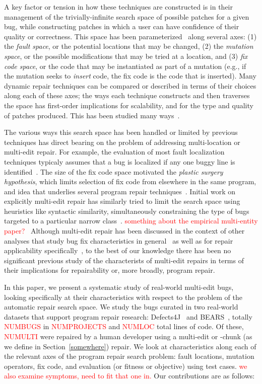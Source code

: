 \documentclass[sigconf, timestamp-false, anonymous=true]{acmart}
\newcommand\todo[1]{\textcolor{red}{#1}}
\begin{document}
A key factor or tension in how these techniques are constructed is in their
management of the trivially-infinite search space of possible patches for a
given bug, while constructing patches in which a user can have confidence of
their quality or correctness.  This space has been parameterized~\cite{refs}
along several axes: (1) the \emph{fault space}, or the potential locations that
may be changed, (2) the \emph{mutation space}, or the possible modifications
that may be tried at a location, and (3) \emph{fix code space}, or the code that may
be instantiated as part of a mutation (e.g., if the mutation seeks to
\emph{insert} code, the fix code is the code that is inserted).  Many dynamic
repair techniques can be compared or described in terms of their choices along
each of these axes; the ways each technique constructs and then traverses the
space has first-order implications for scalability, and for the type and quality
of patches produced.  This has been studied many ways~\cite{examples}.

The various ways this search space has been handled or limited by previous
techniques has direct bearing on the problem of addressing multi-location or
multi-edit repair. For example, the evaluation of most fault localization
techniques typicaly assumes that a bug is localized if any one buggy line is
identified~\cite{fl-survey-wong}.  The size of the fix code space motivated the
\emph{plastic surgery hypothesis}, which limits selection of fix code from
elsewhere in the same program, and idea that underlies several program repair
techniques~\cite{foo}.  
Initial work on explicitly multi-edit repair has similarly tried to limit the
search space using heuristics like syntactic similarity, simultaneously constraining the type
of bugs targeted to a particular narrow
class~\cite{saha2019harnessing,jiang2019cmsuggester}. \todo{something about the
  empirical multi-entity paper?~\cite{wang2018}} 
Although multi-edit repair has been discussed in the context of other analyses
that study bug fix characteristics in general~\cite{examples} as well as for
repair applicability specifically~\cite{moar,examples}, to the best of our
knowledge there has been no significant previous study of the characterists of
multi-edit repairs in terms of their implications for repairability or, more
broadly, program repair.  

In this paper, we present a systematic study of real-world multi-edit bugs,
looking specifically at their characteristics with respect to the problem of the
automatic repair search space.  
We study the bugs curated in two
real-world datasets that support program repair research: Defects4J~\cite{d4j}
and BEARS~\cite{bears}, totally \todo{NUMBUGS} in \todo{NUMPROJECTS} and
\todo{NUMLOC} total lines of code.  Of these, \todo{NUMULTI} were repaired by a
human developer using a multi-edit or -chunk (as we define in
Section~\ref{somewhere}) repair.  We look at characteristics along each of the
relevant axes of the program repair search problem: fault locations, mutation
operators, fix code, and evaluation (or fitness or objective) using test cases.  
\todo{we also examine symptoms, need to fit that one in.}  Our contributions are
as follows:
\end{document}

